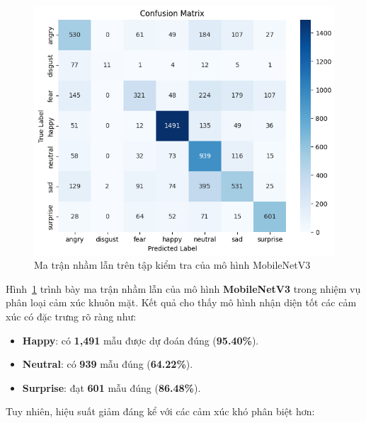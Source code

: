 \begin{figure}[H]
\centering
\includegraphics[width=1\textwidth]{img/confusionMatrixMobilenetV3.png}
\caption{Ma trận nhầm lẫn trên tập kiểm tra của mô hình MobileNetV3}
\label{fig:confusion-mobilenetv3}
\end{figure}

Hình~\ref{fig:confusion-mobilenetv3} trình bày ma trận nhầm lẫn của mô hình \textbf{MobileNetV3} trong nhiệm vụ phân loại cảm xúc khuôn mặt. Kết quả cho thấy mô hình nhận diện tốt các cảm xúc có đặc trưng rõ ràng như:

\begin{itemize}
    \item \textbf{Happy}: có \textbf{1,491} mẫu được dự đoán đúng (\textbf{95.40\%}).
    \item \textbf{Neutral}: có \textbf{939} mẫu đúng (\textbf{64.22\%}).
    \item \textbf{Surprise}: đạt \textbf{601} mẫu đúng (\textbf{86.48\%}).
\end{itemize}

Tuy nhiên, hiệu suất giảm đáng kể với các cảm xúc khó phân biệt hơn:

